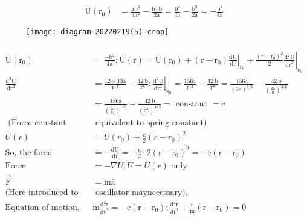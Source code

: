 \begin{enumerate}
\begin{answer}
\begin{align*}
		 \mathrm{U}\left(\mathrm{r}_{0}\right)&=\frac{\mathrm{ab}^{2}}{4 \mathrm{a}^{2}}-\frac{\mathrm{b} \cdot \mathrm{b}}{2 \mathrm{a}}=\frac{\mathrm{b}^{2}}{4 \mathrm{a}}-\frac{\mathrm{b}^{2}}{2 \mathrm{a}}=-\frac{\mathrm{b}^{2}}{4 \mathrm{a}}
			\end{align*}
			\begin{figure}[H]
				\centering
				\texttt{[image: diagram-20220219(5)-crop]}
			\end{figure}
			\begin{align*}\\
		\mathrm{U}\left(\mathrm{r}_{0}\right)&=\frac{-\mathrm{b}^{2}}{4 \mathrm{a}} ; \mathrm{U}(\mathrm{r})=\mathrm{U}\left(\mathrm{r}_{0}\right)+\left.\left(\mathrm{r}-\mathrm{r}_{0}\right) \frac{\mathrm{dU}}{\mathrm{dr}}\right|_{\mathrm{r}_{0}}+\left.\frac{\left(\mathrm{r}-\mathrm{r}_{0}\right)^{2}}{2} \frac{\mathrm{d}^{2} \mathrm{U}}{\mathrm{dr}^{2}}\right|_{\mathrm{c}_{0}}\\
		\frac{\mathrm{d}^{2} \mathrm{U}}{\mathrm{dr}^{2}}&=\frac{12 \times 13 \mathrm{a}}{\mathrm{r}^{14}}-\frac{42 \mathrm{~b}}{\mathrm{r}^{8}} ;\left.\frac{\mathrm{d}^{2} \mathrm{U}}{\mathrm{dr}^{2}}\right|_{\mathrm{k}_{0}}=\frac{156 \mathrm{a}}{\mathrm{r}^{14}}-\frac{42 \mathrm{~b}}{\mathrm{r}^{8}}=\frac{156 \mathrm{a}}{(2 \mathrm{a})^{1 / 6}}-\frac{42 \mathrm{~b}}{\left(\frac{2 \mathrm{a}}{\mathrm{h}}\right)^{3 / 6}}\\
		&=\frac{156 \mathrm{a}}{\left(\frac{2 \mathrm{a}}{\mathrm{b}}\right)^{1 / 3}}-\frac{42 \mathrm{~b}}{\left(\frac{2 \mathrm{a}}{\mathrm{b}}\right)^{1 / 3}}=\text { constant }=c\\
	\text{	(Force constant}&\text{ equivalent to spring constant)}\\
		U(r)&=U\left(r_{0}\right)+\frac{c}{2}\left(r-r_{0}\right)^{2}\\
		\text{So, the force }&=-\frac{\mathrm{dU}}{\mathrm{dr}}=-\frac{\mathrm{c}}{2} \cdot 2\left(\mathrm{r}-\mathrm{r}_{0}\right)^{2}=-\mathrm{c}\left(\mathrm{r}-\mathrm{r}_{0}\right)\\
		\text{Force }&=-\nabla U ; U=U(r)\text{ only}\\
		\overrightarrow{\mathrm{F}}&=\mathrm{m} \overline{\mathrm{a}}\\ \text{(Here introduced to harmonic}&\text{ oscillator maynecessary).}\\
		 \text{Equation of motion, }&\mathrm{m} \frac{\mathrm{d}^{2} \mathrm{r}}{\mathrm{dt}^{2}}=-\mathrm{c}\left(\mathrm{r}-\mathrm{r}_{0}\right) ; \frac{\mathrm{d}^{2} \mathrm{r}}{\mathrm{dt}^{2}}+\frac{\mathrm{c}}{\mathrm{m}}\left(\mathrm{r}-\mathrm{r}_{0}\right)=0\\

\end{align*}
\end{answer}
\end{enumerate}
